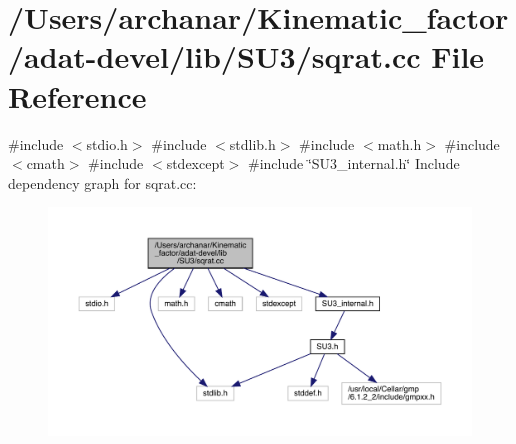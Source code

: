 \hypertarget{adat-devel_2lib_2SU3_2sqrat_8cc}{}\section{/\+Users/archanar/\+Kinematic\+\_\+factor/adat-\/devel/lib/\+S\+U3/sqrat.cc File Reference}
\label{adat-devel_2lib_2SU3_2sqrat_8cc}
{\ttfamily \#include $<$stdio.\+h$>$}\newline
{\ttfamily \#include $<$stdlib.\+h$>$}\newline
{\ttfamily \#include $<$math.\+h$>$}\newline
{\ttfamily \#include $<$cmath$>$}\newline
{\ttfamily \#include $<$stdexcept$>$}\newline
{\ttfamily \#include \char`\"{}S\+U3\+\_\+internal.\+h\char`\"{}}\newline
Include dependency graph for sqrat.\+cc\+:
\nopagebreak
\begin{figure}[H]
\begin{center}
\leavevmode
\includegraphics[width=350pt]{dd/dc2/adat-devel_2lib_2SU3_2sqrat_8cc__incl}
\end{center}
\end{figure}
